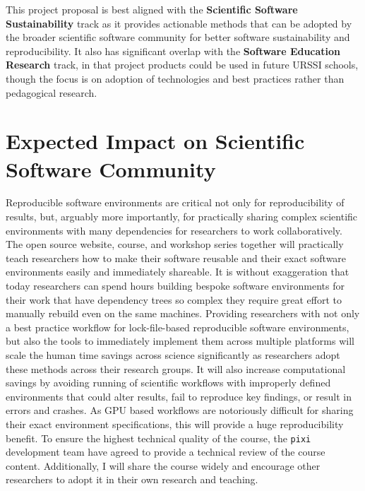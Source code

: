 \documentclass[letterpaper, 11pt]{article}
\newcommand{\program}{URSSI}
\newcommand{\pixi}{\texttt{pixi}}
\begin{document}
This project proposal is best aligned with the \textbf{Scientific Software Sustainability} track as it provides actionable methods that can be adopted by the broader scientific software community for better software sustainability and reproducibility.
It also has significant overlap with the \textbf{Software Education Research} track, in that project products could be used in future \program{} schools, though the focus is on adoption of technologies and best practices rather than pedagogical research.
%

\section{Expected Impact on Scientific Software Community}


Reproducible software environments are critical not only for reproducibility of results, but, arguably more importantly, for practically sharing complex scientific environments with many dependencies for researchers to work collaboratively.
The open source website, course, and workshop series together will practically teach researchers how to make their software reusable and their exact software environments easily and immediately shareable.
It is without exaggeration that today researchers can spend hours building bespoke software environments for their work that have dependency trees so complex they require great effort to manually rebuild even on the same machines.
Providing researchers with not only a best practice workflow for lock-file-based reproducible software environments, but also the tools to immediately implement them across multiple platforms will scale the human time savings across science significantly as researchers adopt these methods across their research groups.
It will also increase computational savings by avoiding running of scientific workflows with improperly defined environments that could alter results, fail to reproduce key findings, or result in errors and crashes.
As GPU based workflows are notoriously difficult for sharing their exact environment specifications, this will provide a huge reproducibility benefit.
To ensure the highest technical quality of the course, the \pixi{} development team have agreed to provide a technical review of the course content.
Additionally, I will share the course widely and encourage other researchers to adopt it in their own research and teaching.
\end{document}
